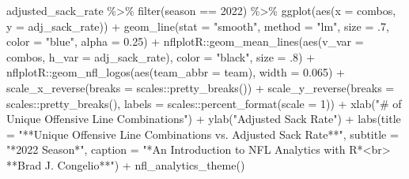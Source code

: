 \documentclass[
  letterpaper,
]{krantz}
\newenvironment{Shaded}{\begin{snugshade}}{\end{snugshade}}
\newcommand{\AttributeTok}[1]{\textcolor[rgb]{0.40,0.45,0.13}{#1}}
\newcommand{\DecValTok}[1]{\textcolor[rgb]{0.68,0.00,0.00}{#1}}
\newcommand{\FloatTok}[1]{\textcolor[rgb]{0.68,0.00,0.00}{#1}}
\newcommand{\FunctionTok}[1]{\textcolor[rgb]{0.28,0.35,0.67}{#1}}
\newcommand{\NormalTok}[1]{\textcolor[rgb]{0.00,0.23,0.31}{#1}}
\newcommand{\SpecialCharTok}[1]{\textcolor[rgb]{0.37,0.37,0.37}{#1}}
\newcommand{\StringTok}[1]{\textcolor[rgb]{0.13,0.47,0.30}{#1}}
\begin{document}
\begin{Shaded}
\begin{Highlighting}[]
\NormalTok{adjusted\_sack\_rate }\SpecialCharTok{\%\textgreater{}\%}
  \FunctionTok{filter}\NormalTok{(season }\SpecialCharTok{==} \DecValTok{2022}\NormalTok{) }\SpecialCharTok{\%\textgreater{}\%}
  \FunctionTok{ggplot}\NormalTok{(}\FunctionTok{aes}\NormalTok{(}\AttributeTok{x =}\NormalTok{ combos, }\AttributeTok{y =}\NormalTok{ adj\_sack\_rate)) }\SpecialCharTok{+}
  \FunctionTok{geom\_line}\NormalTok{(}\AttributeTok{stat =} \StringTok{"smooth"}\NormalTok{, }\AttributeTok{method =} \StringTok{"lm"}\NormalTok{,}
            \AttributeTok{size =}\NormalTok{ .}\DecValTok{7}\NormalTok{,}
            \AttributeTok{color =} \StringTok{"blue"}\NormalTok{,}
            \AttributeTok{alpha =} \FloatTok{0.25}\NormalTok{) }\SpecialCharTok{+}
\NormalTok{  nflplotR}\SpecialCharTok{::}\FunctionTok{geom\_mean\_lines}\NormalTok{(}\FunctionTok{aes}\NormalTok{(}\AttributeTok{v\_var =}\NormalTok{ combos, }\AttributeTok{h\_var =}\NormalTok{ adj\_sack\_rate),}
                            \AttributeTok{color =} \StringTok{"black"}\NormalTok{, }\AttributeTok{size =}\NormalTok{ .}\DecValTok{8}\NormalTok{) }\SpecialCharTok{+}
\NormalTok{  nflplotR}\SpecialCharTok{::}\FunctionTok{geom\_nfl\_logos}\NormalTok{(}\FunctionTok{aes}\NormalTok{(}\AttributeTok{team\_abbr =}\NormalTok{ team), }\AttributeTok{width =} \FloatTok{0.065}\NormalTok{) }\SpecialCharTok{+}
  \FunctionTok{scale\_x\_reverse}\NormalTok{(}\AttributeTok{breaks =}\NormalTok{ scales}\SpecialCharTok{::}\FunctionTok{pretty\_breaks}\NormalTok{()) }\SpecialCharTok{+}
  \FunctionTok{scale\_y\_reverse}\NormalTok{(}\AttributeTok{breaks =}\NormalTok{ scales}\SpecialCharTok{::}\FunctionTok{pretty\_breaks}\NormalTok{(),}
                     \AttributeTok{labels =}\NormalTok{ scales}\SpecialCharTok{::}\FunctionTok{percent\_format}\NormalTok{(}\AttributeTok{scale =} \DecValTok{1}\NormalTok{)) }\SpecialCharTok{+}
  \FunctionTok{xlab}\NormalTok{(}\StringTok{"\# of Unique Offensive Line Combinations"}\NormalTok{) }\SpecialCharTok{+}
  \FunctionTok{ylab}\NormalTok{(}\StringTok{"Adjusted Sack Rate"}\NormalTok{) }\SpecialCharTok{+}
  \FunctionTok{labs}\NormalTok{(}\AttributeTok{title =} \StringTok{"**Unique Offensive Line Combinations vs.}
\StringTok{       Adjusted Sack Rate**"}\NormalTok{,}
       \AttributeTok{subtitle =} \StringTok{"*2022 Season*"}\NormalTok{,}
       \AttributeTok{caption =} \StringTok{"*An Introduction to NFL Analytics with R*\textless{}br\textgreater{}}
\StringTok{       **Brad J. Congelio**"}\NormalTok{) }\SpecialCharTok{+}
  \FunctionTok{nfl\_analytics\_theme}\NormalTok{()}
\end{Highlighting}
\end{Shaded}
\end{document}
